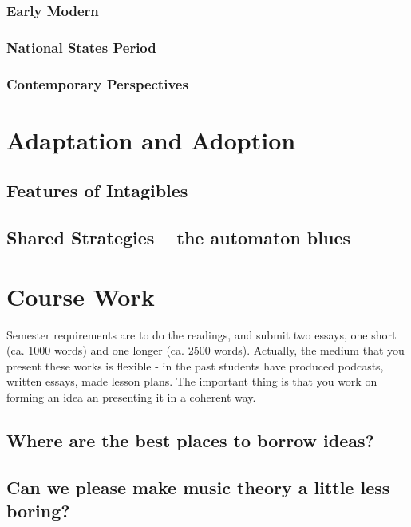 \documentclass[11pt]{article}
\begin{document}
\subsubsection*{Early Modern}
\label{sec:orgf198a88}
\subsubsection*{National States Period}
\label{sec:org9d9562c}
\subsubsection*{Contemporary Perspectives}
\label{sec:orgdca79b9}


\section*{Adaptation and Adoption}
\label{sec:org405574a}
\subsection*{Features of Intagibles}
\label{sec:orgf359230}
\subsection*{Shared Strategies – the automaton blues}
\label{sec:orgb8fb1db}


\section*{Course Work}
\label{sec:org88c9a1a}
Semester requirements are to do the readings, and submit two essays,
one short (ca. 1000 words) and one longer (ca. 2500 words). Actually,
the medium that you present these works is flexible - in the past
students have produced podcasts, written essays, made lesson
plans. The important thing is that you work on forming an idea an
presenting it in a coherent way.

\subsection*{Where are the best places to borrow ideas?}
\label{sec:org0b2cc51}
\subsection*{Can we please make music theory a little less boring?}
\label{sec:orgabb5af2}
\end{document}
